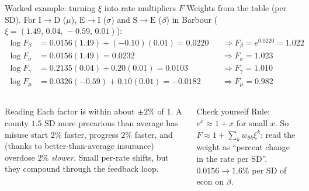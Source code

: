 ﻿\documentclass[9pt,aspectratio=169]{beamer}
\newcommand{\Sc}{\mathrm{S}}\newcommand{\Ec}{\mathrm{E}}\newcommand{\Ic}{\mathrm{I}}\newcommand{\Rc}{\mathrm{R}}\newcommand{\Dc}{\mathrm{D}}
\begin{document}
\begin{frame}{Worked example: turning $\xi$ into rate multipliers $F$}
 Weights from the table (per SD). For $\Ic\to\Dc$ ($\mu$), $\Ec\to\Ic$ ($\sigma$) and $\Sc\to\Ec$ ($\beta$) in Barbour ($\xi=(1.49,\,0.04,\,-0.59,\,0.01)$):
 \begin{align*}
  \log F_\beta&=0.0156(1.49)+(-0.10)(0.01)=0.0220 &&\Rightarrow F_\beta=e^{0.0220}=1.022\\
  \log F_\sigma&=0.0156(1.49)=0.0232 &&\Rightarrow F_\sigma=1.023\\
  \log F_\gamma&=0.2135(0.04)+0.20(0.01)=0.0103 &&\Rightarrow F_\gamma=1.010\\
  \log F_\mu&=0.0326(-0.59)+0.10(0.01)=-0.0182 &&\Rightarrow F_\mu=0.982
 \end{align*}
 \begin{columns}[T]
 \begin{block}{Reading}\small
  Each factor is within about $\pm2\%$ of 1. A county $1.5$ SD more precarious than average has misuse start $2\%$ faster, progress $2\%$ faster, and (thanks to better-than-average insurance) overdose $2\%$ \emph{slower}. Small per-rate shifts, but they compound through the feedback loop.
 \end{block}
 \begin{block}{Check yourself}\small
  Rule: $e^{x}\approx1+x$ for small $x$. So $F\approx1+\sum_kw_{\theta k}\xi^k$: read the weight as ``percent change in the rate per SD''. $0.0156\to1.6\%$ per SD of econ on $\beta$.
 \end{block}
 \end{columns}
\end{frame}
\end{document}
